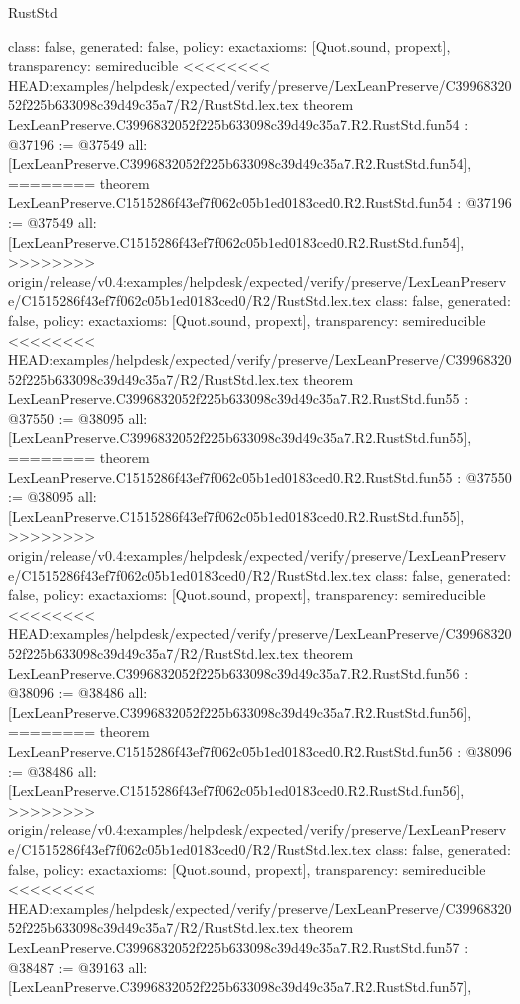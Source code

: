 \begin{lexlean}{RustStd}
\begin{coremodule}
{\begin{coremodule}
{{{{{{{{{{{{{{{{{{{{{{{{{{{{{{{{{{{{{{{{{{{{{{{{{{{{{{{{{  class: false,
  generated: false,
  policy: exact{axioms: [Quot.sound, propext]},
  transparency: semireducible
}
<<<<<<<< HEAD:examples/helpdesk/expected/verify/preserve/LexLeanPreserve/C3996832052f225b633098c39d49c35a7/R2/RustStd.lex.tex
theorem LexLeanPreserve.C3996832052f225b633098c39d49c35a7.R2.RustStd.fun54 : @37196 := @37549 {
  all: [LexLeanPreserve.C3996832052f225b633098c39d49c35a7.R2.RustStd.fun54],
========
theorem LexLeanPreserve.C1515286f43ef7f062c05b1ed0183ced0.R2.RustStd.fun54 : @37196 := @37549 {
  all: [LexLeanPreserve.C1515286f43ef7f062c05b1ed0183ced0.R2.RustStd.fun54],
>>>>>>>> origin/release/v0.4:examples/helpdesk/expected/verify/preserve/LexLeanPreserve/C1515286f43ef7f062c05b1ed0183ced0/R2/RustStd.lex.tex
  class: false,
  generated: false,
  policy: exact{axioms: [Quot.sound, propext]},
  transparency: semireducible
}
<<<<<<<< HEAD:examples/helpdesk/expected/verify/preserve/LexLeanPreserve/C3996832052f225b633098c39d49c35a7/R2/RustStd.lex.tex
theorem LexLeanPreserve.C3996832052f225b633098c39d49c35a7.R2.RustStd.fun55 : @37550 := @38095 {
  all: [LexLeanPreserve.C3996832052f225b633098c39d49c35a7.R2.RustStd.fun55],
========
theorem LexLeanPreserve.C1515286f43ef7f062c05b1ed0183ced0.R2.RustStd.fun55 : @37550 := @38095 {
  all: [LexLeanPreserve.C1515286f43ef7f062c05b1ed0183ced0.R2.RustStd.fun55],
>>>>>>>> origin/release/v0.4:examples/helpdesk/expected/verify/preserve/LexLeanPreserve/C1515286f43ef7f062c05b1ed0183ced0/R2/RustStd.lex.tex
  class: false,
  generated: false,
  policy: exact{axioms: [Quot.sound, propext]},
  transparency: semireducible
}
<<<<<<<< HEAD:examples/helpdesk/expected/verify/preserve/LexLeanPreserve/C3996832052f225b633098c39d49c35a7/R2/RustStd.lex.tex
theorem LexLeanPreserve.C3996832052f225b633098c39d49c35a7.R2.RustStd.fun56 : @38096 := @38486 {
  all: [LexLeanPreserve.C3996832052f225b633098c39d49c35a7.R2.RustStd.fun56],
========
theorem LexLeanPreserve.C1515286f43ef7f062c05b1ed0183ced0.R2.RustStd.fun56 : @38096 := @38486 {
  all: [LexLeanPreserve.C1515286f43ef7f062c05b1ed0183ced0.R2.RustStd.fun56],
>>>>>>>> origin/release/v0.4:examples/helpdesk/expected/verify/preserve/LexLeanPreserve/C1515286f43ef7f062c05b1ed0183ced0/R2/RustStd.lex.tex
  class: false,
  generated: false,
  policy: exact{axioms: [Quot.sound, propext]},
  transparency: semireducible
}
<<<<<<<< HEAD:examples/helpdesk/expected/verify/preserve/LexLeanPreserve/C3996832052f225b633098c39d49c35a7/R2/RustStd.lex.tex
theorem LexLeanPreserve.C3996832052f225b633098c39d49c35a7.R2.RustStd.fun57 : @38487 := @39163 {
  all: [LexLeanPreserve.C3996832052f225b633098c39d49c35a7.R2.RustStd.fun57],
}}}}}}}}}}}}}}}}}}}}}}}}}}}}}}}}}}}}}}}}}}}}}}}}}}}}}}}}}}}}
\end{coremodule}}
\end{coremodule}
\end{lexlean}
